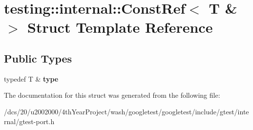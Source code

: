 \hypertarget{structtesting_1_1internal_1_1ConstRef_3_01T_01_6_01_4}{}\section{testing\+:\+:internal\+:\+:Const\+Ref$<$ T \& $>$ Struct Template Reference}
\label{structtesting_1_1internal_1_1ConstRef_3_01T_01_6_01_4}
\subsection*{Public Types}
\begin{DoxyCompactItemize}
\item 
\mbox{\label{structtesting_1_1internal_1_1ConstRef_3_01T_01_6_01_4_a9f664dd25649a0d260cfb1f610c7a349}} 
typedef T \& {\bfseries type}
\end{DoxyCompactItemize}


The documentation for this struct was generated from the following file\+:\begin{DoxyCompactItemize}
\item 
/dcs/20/u2002000/4th\+Year\+Project/wash/googletest/googletest/include/gtest/internal/gtest-\/port.\+h\end{DoxyCompactItemize}
